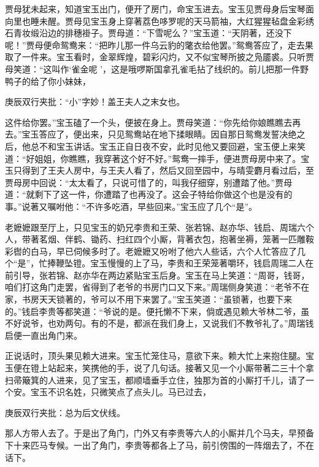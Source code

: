 \begin{parag}
    贾母犹未起来，知道宝玉出门，便开了房门，命宝玉进去。宝玉见贾母身后宝琴面向里也睡未醒。贾母见宝玉身上穿著荔色哆罗呢的天马箭袖，大红猩猩毡盘金彩绣石青妆缎沿边的排穗褂子。贾母道：“下雪呢么？”宝玉道：“天阴著，还没下呢！”贾母便命鸳鸯来：“把昨儿那一件乌云豹的氅衣给他罢。”鸳鸯答应了，走去果取了一件来。宝玉看时，金翠辉煌，碧彩闪灼，又不似宝琴所披之凫靥裘。只听贾母笑道：“这叫作‘雀金呢 ’，这是哦啰斯国拿孔雀毛拈了线织的。前儿把那一件野鸭子的给了你小妹妹，\begin{note}庚辰双行夹批：“小”字妙！盖王夫人之末女也。\end{note}这件给你罢。”宝玉磕了一个头，便披在身上。贾母笑道：“你先给你娘瞧瞧去再去。”宝玉答应了，便出来，只见鸳鸯站在地下揉眼睛。因自那日鸳鸯发誓决绝之后，他总不和宝玉讲话。宝玉正自日夜不安，此时见他又要回避，宝玉便上来笑道：“好姐姐，你瞧瞧，我穿著这个好不好。”鸳鸯一摔手，便进贾母房中来了。宝玉只得到了王夫人房中，与王夫人看了，然后又回至园中，与晴雯麝月看过后，至贾母房中回说：“太太看了，只说可惜了的，叫我仔细穿，别遭踏了他。”贾母道：“就剩下了这一件，你遭踏了也再没了。这会子特给你做这个也是没有的事。”说著又嘱咐他：“不许多吃酒，早些回来。”宝玉应了几个“是”。
\end{parag}


\begin{parag}
    老嬷嬷跟至厅上，只见宝玉的奶兄李贵和王荣、张若锦、赵亦华、钱启、周瑞六个人，带著茗烟、伴鹤、锄药、扫红四个小厮，背著衣包，抱著坐褥，笼著一匹雕鞍彩辔的白马，早已伺候多时了。老嬷嬷又吩咐了他六人些话，六个人忙答应了几个“是”，忙捧鞭坠镫。宝玉慢慢的上了马，李贵和王荣笼著嚼环，钱启周瑞二人在前引导，张若锦、赵亦华在两边紧贴宝玉后身。宝玉在马上笑道：“周哥，钱哥，咱们打这角门走罢，省得到了老爷的书房门口又下来。”周瑞侧身笑道：“老爷不在家，书房天天锁著的，爷可以不用下来罢了。”宝玉笑道：“虽锁著，也要下来的。”钱启李贵等都笑道：“爷说的是。便托懒不下来，倘或遇见赖大爷林二爷，虽不好说爷，也劝两句。有的不是，都派在我们身上，又说我们不教爷礼了。”周瑞钱启便一直出角门来。
\end{parag}


\begin{parag}
    正说话时，顶头果见赖大进来。宝玉忙笼住马，意欲下来。赖大忙上来抱住腿。宝玉便在镫上站起来，笑携他的手，说了几句话。接著又见一个小厮带著二三十个拿扫帚簸箕的人进来，见了宝玉，都顺墙垂手立住，独那为首的小厮打千儿，请了一个安。宝玉不识名姓，只微笑点了点头儿。马已过去，\begin{note}庚辰双行夹批：总为后文伏线。\end{note}那人方带人去了。于是出了角门，门外又有李贵等六人的小厮并几个马夫，早预备下十来匹马专候。一出了角门，李贵等都各上了马，前引傍围的一阵烟去了，不在话下。
\end{parag}


